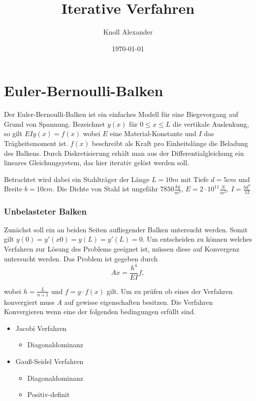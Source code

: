 \documentclass[12pt,titlepage]{article}
\author{Knoll Alexander }
\title{Iterative Verfahren}
\date{\today}
\begin{document}
\maketitle

\part*{Euler-Bernoulli-Balken}

	Der Euler-Bernoulli-Balken ist ein einfaches Modell für eine Biegevorgang auf Grund von
	Spannung. Bezeichnet $y(x)$ für $0 ≤ x ≤ L$ die vertikale Auslenkung, so gilt
	$EIy (x) = f (x)$ wobei $E$ eine Material-Konstante und $I$ das Trägheitsmoment ist. 
	$f(x)$ beschreibt als Kraft pro Einheitslänge die Beladung des Balkens. Durch Diskretisierung erhält man aus der Differentialgleichung ein lineares Gleichungsystem, das hier iterativ gelöst werden soll.
	
	Betrachtet wird dabei ein Stahlträger der Länge $L = 10m$ mit Tiefe $d = 5cm$ und Breite $b = 10cm$. Die Dichte von Stahl ist ungefähr $7850 \frac{kg}{m^3}$, 
	$E = 2 \cdot 10^11 \frac{N}{m^2}$, $I = \frac{bd^3}{12}$

\section{Unbelasteter Balken}

	Zunächst soll ein an beiden Seiten aufliegender Balken untersucht werden.
	Somit gilt $y(0) = y'(x0) = y(L) = y'(L) = 0 $.\newline
	Um entscheiden zu können welches Verfahren zur Lösung des Problems geeignet ist, müssen diese auf Konvergenz untersucht werden. Das Problem ist gegeben durch
	\begin{equation}
		Ax = \frac{h^4}{EI}f,
	\end{equation}
	
	wobei $h = \frac{L}{n+1}$ und $f = g \cdot f(x)$ gilt. Um zu prüfen ob eines der Verfahren konvergiert muss $A$ auf gewisse eigenschaften besitzen. Die Verfahren Konvergieren wenn eine der folgenden bedingungen erfüllt sind.
	
	\begin{itemize}
		\centering
		\item Jacobi Verfahren
		\begin{itemize}
			\centering	
			\item Diagonaldominanz
		\end{itemize}
		\item Gauß-Seidel Verfahren
		\begin{itemize}
			\centering
			\item Diagonaldominanz
			\item Positiv-definit
		\end{itemize}
	\end{itemize}
	
\end{document}
